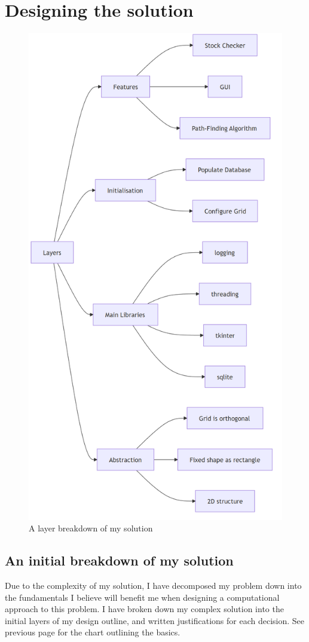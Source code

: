 
\chapter{Designing the solution}

\begin{figure}[!htbp]
	\centering
	\includegraphics[width=0.5\linewidth]{Images/breakdown1.png}
	\caption{A layer breakdown of my solution}
\end{figure}

\section{An initial breakdown of my solution}

Due to the complexity of my solution, I have decomposed my problem down into the fundamentals I believe will benefit me when designing a computational approach to this problem. I have broken down my complex solution into the initial layers of my design outline, and written justifications for each decision. See previous page for the chart outlining the basics.

